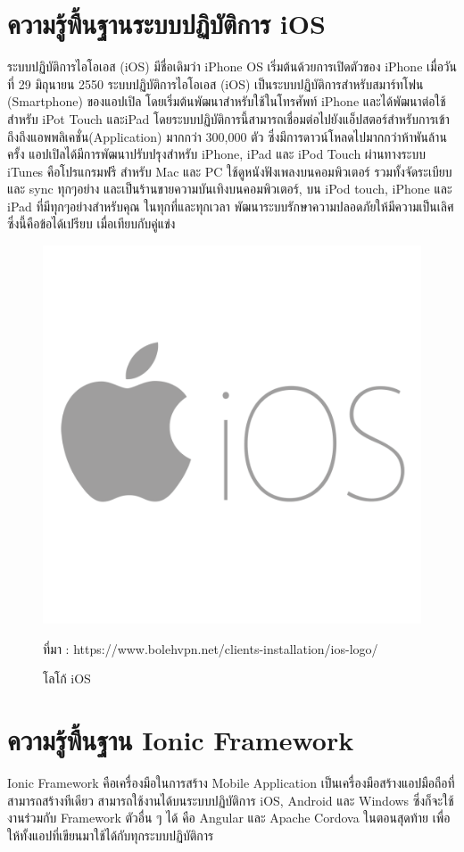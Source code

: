 		\section{ความรู้พื้นฐานระบบปฏิบัติการ iOS}
		ระบบปฏิบัติการไอโอเอส (iOS) มีชื่อเดิมว่า iPhone OS เริ่มต้นด้วยการเปิดตัวของ iPhone เมื่อวันที่ 29 มิถุนายน 2550 ระบบปฏิบัติการไอโอเอส (iOS) เป็นระบบปฏิบัติการสำหรับสมาร์ทโฟน (Smartphone) ของแอปเปิล โดยเริ่มต้นพัฒนาสำหรับใช้ในโทรศัพท์ iPhone และได้พัฒนาต่อใช้สำหรับ iPot Touch และiPad โดยระบบปฏิบัติการนี้สามารถเชื่อมต่อไปยังแอ็ปสตอร์สำหรับการเข้าถึงถึงแอพพลิเคชั่น(Application) มากกว่า 300,000 ตัว ซึ่งมีการดาวน์โหลดไปมากกว่าห้าพันล้านครั้ง แอปเปิลได้มีการพัฒนาปรับปรุงสำหรับ iPhone, iPad และ iPod Touch ผ่านทางระบบ iTunes คือโปรแกรมฟรี สำหรับ Mac และ PC ใช้ดูหนังฟังเพลงบนคอมพิวเตอร์ รวมทั้งจัดระเบียบและ sync ทุกๆอย่าง และเป็นร้านขายความบันเทิงบนคอมพิวเตอร์, บน iPod touch, iPhone และ iPad ที่มีทุกๆอย่างสำหรับคุณ ในทุกที่และทุกเวลา พัฒนาระบบรักษาความปลอดภัยให้มีความเป็นเลิศ ซึ่งนี้คือข้อได้เปรียบ เมื่อเทียบกับคู่แข่ง	
			  \begin{figure}[H]
				\centering
				\includegraphics[width=0.5\columnwidth]{Figures/2/iOS-logo}
				\caption{โลโก้ iOS}{ที่มา : https://www.bolehvpn.net/clients-installation/ios-logo/}
				\label{Fig:ioslogo}
			\end{figure}

	 \section{ความรู้พื้นฐาน Ionic Framework}
	 Ionic Framework คือเครื่องมือในการสร้าง Mobile Application เป็นเครื่องมือสร้างแอปมือถือที่สามารถสร้างทีเดียว สามารถใช้งานได้บนระบบปฏิบัติการ 
	 iOS, Android และ Windows ซึ่งก็จะใช้งานร่วมกับ Framework ตัวอื่น ๆ ได้ คือ Angular และ Apache Cordova 
	 ในตอนสุดท้าย เพื่อให้ทั้งแอปที่เขียนมาใช้ได้กับทุกระบบปฏิบัติการ

